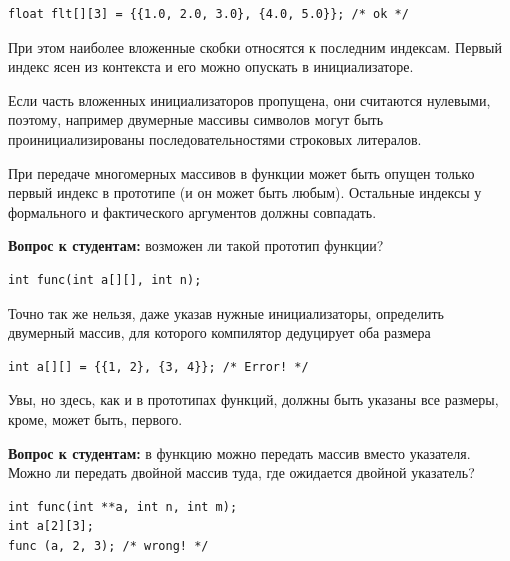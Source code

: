 \documentclass[a4paper,12pt,oneside]{article}
\newif\ifanswers
\begin{document}
\begin{lstlisting}
float flt[][3] = {{1.0, 2.0, 3.0}, {4.0, 5.0}}; /* ok */
\end{lstlisting}

При этом наиболее вложенные скобки относятся к последним индексам. Первый индекс ясен из контекста и его можно опускать в инициализаторе.

Если часть вложенных инициализаторов пропущена, они считаются нулевыми, поэтому, например двумерные массивы символов могут быть проинициализированы последовательностями строковых литералов.

При передаче многомерных массивов в функции может быть опущен только первый индекс в прототипе (и он может быть любым). Остальные индексы у формального и фактического аргументов должны совпадать.

\textbf{Вопрос к студентам:} возможен ли такой прототип функции?

\begin{lstlisting}
int func(int a[][], int n);
\end{lstlisting}

\ifanswers
Правильный ответ: нет, так как у статического массива не могут быть опущены оба индекса. Допустимы следующие варианты:

\begin{lstlisting}
int func(int a[][3], int n);
int func(int (*a)[3], int n);
\end{lstlisting}
\fi

Точно так же нельзя, даже указав нужные инициализаторы, определить двумерный массив, для которого компилятор дедуцирует оба размера

\begin{lstlisting}
int a[][] = {{1, 2}, {3, 4}}; /* Error! */
\end{lstlisting}

Увы, но здесь, как и в прототипах функций, должны быть указаны все размеры, кроме, может быть, первого.

\textbf{Вопрос к студентам:} в функцию можно передать массив вместо указателя. Можно ли передать двойной массив туда, где ожидается двойной указатель?

\begin{lstlisting}
int func(int **a, int n, int m);
int a[2][3];
func (a, 2, 3); /* wrong! */
\end{lstlisting}

\ifanswers
Но это не работает. Двумерный массив уже не может деградировать к указателю на указатель, а только к указателю на массив (из рисунка \ref{fig:c_arrays} причины должны быть уже очевидны). 
\fi
\end{document}
